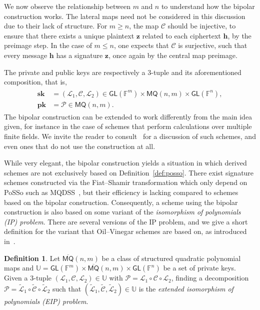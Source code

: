\documentclass[draft, 12pt, a4paper, oneside]{memoir}
\theoremstyle{definition}
\newtheorem{definition}[theorem]{Definition}
\begin{document}
We now observe the relationship between $m$ and $n$ to understand how the bipolar construction works. The lateral maps need not be considered in this discussion due to their lack of structure. For $m \geq n$, the map $\mathcal{C}$ should be injective, to ensure that there exists a unique plaintext $\mathbf{z}$ related to each ciphertext $\mathbf{h}$, by the preimage step. In the case of $m \leq n$, one expects that $\mathcal{C}$ is surjective, such that every message $\mathbf{h}$ has a signature $\mathbf{z}$, once again by the central map preimage.

The private and public keys are respectively a $3$-tuple and its aforementioned composition, that is,
\begin{align}
  \begin{split}
    \mathbf{sk} &= (\mathcal{L}_{1}, \mathcal{C}, \mathcal{L}_{2}) 
      \in \mathsf{GL}(\mathbb{F}^{m}) \times \mathsf{MQ}(n, m) \times \mathsf{GL}(\mathbb{F}^{n}), \\
    \mathbf{pk} &= \mathcal{P} \in \mathsf{MQ}(n, m).
  \end{split}
\end{align}
The bipolar construction can be extended to work differently from the main idea given, for instance in the case of schemes that perform calculations over multiple finite fields. We invite the reader to consult~\cite[Section 2.2]{Petzoldt:201307} for a discussion of such schemes, and even ones that do not use the construction at all.

While very elegant, the bipolar construction yields a situation in which derived schemes are not exclusively based on Definition~\ref{def:posso}. There exist signature schemes constructed via the Fiat--Shamir transformation which only depend on \textsf{PoSSo} such as MQDSS~\cite{Chen:201612}, but their efficiency is lacking compared to schemes based on the bipolar construction. Consequently, a scheme using the bipolar construction is also based on some variant of the \emph{isomorphism of polynomials (IP) problem}. There are several versions of the IP problem, and we give a short definition for the variant that Oil--Vinegar schemes are based on, as introduced in~\cite{Ding:200806}.

\begin{definition}\label{def:eip}
  Let $\overline{\mathsf{MQ}}(n, m)$ be a class of structured quadratic polynomial maps and $\mathbb{U} = \mathsf{GL}(\mathbb{F}^{m}) \times \overline{\mathsf{MQ}}(n, m) \times \mathsf{GL}(\mathbb{F}^{n})$ be a set of private keys. Given a $3$-tuple $(\mathcal{L}_{1}, \mathcal{C}, \mathcal{L}_{2}) \in \mathbb{U}$ with $\mathcal{P} = \mathcal{L}_{1} \circ \mathcal{C} \circ \mathcal{L}_{2}$, finding a decomposition $\mathcal{P} = \widetilde{\mathcal{L}}_{1} \circ \widetilde{\mathcal{C}} \circ \widetilde{\mathcal{L}}_{2}$ such that $(\widetilde{\mathcal{L}}_{1}, \widetilde{\mathcal{C}}, \widetilde{\mathcal{L}}_{2}) \in \mathbb{U}$ is the \emph{extended isomorphism of polynomials (EIP) problem}.
\end{definition}
\end{document}
